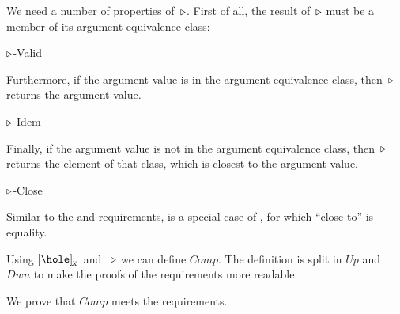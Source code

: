 We need a number of properties of~$\triangleright$. First of all, the result of~$\triangleright$ must be a member of its argument equivalence class:  

	{$\triangleright$-Valid}

Furthermore, if the argument value is in the argument equivalence class, then~$\triangleright$ returns the argument value.
 
	{$\triangleright$-Idem} 

Finally, if the argument value is not in the argument equivalence class, then~$\triangleright$ returns the element of that class, which is closest to the argument value.

		{$\triangleright$-Close} 

Similar to the  and  requirements,  is a special case of , for which ``close to'' is equality.

Using $\eqcl{\hole}{X}$ and ~$\triangleright$ we can define $Comp$. The definition is split in $Up$ and $Dwn$ to make the proofs of the requirements more readable. %



We prove that $Comp$ meets the requirements.


